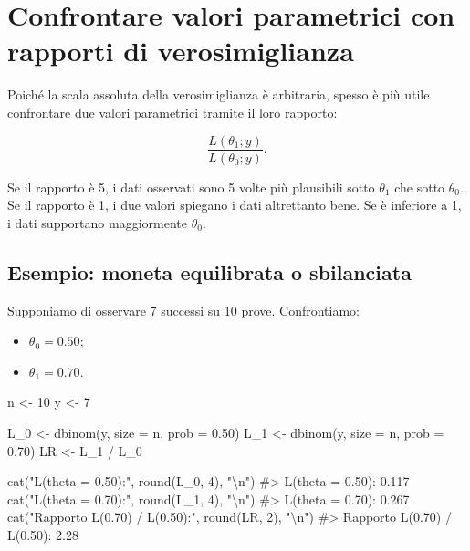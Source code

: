 \documentclass[
  italian,
  letterpaper,
  a4paper,
  11pt,
  open=any]{scrbook}
\newenvironment{Shaded}{\begin{snugshade}}{\end{snugshade}}
\newcommand{\AttributeTok}[1]{\textcolor[rgb]{0.40,0.45,0.13}{#1}}
\newcommand{\CommentTok}[1]{\textcolor[rgb]{0.37,0.37,0.37}{#1}}
\newcommand{\DecValTok}[1]{\textcolor[rgb]{0.68,0.00,0.00}{#1}}
\newcommand{\FloatTok}[1]{\textcolor[rgb]{0.68,0.00,0.00}{#1}}
\newcommand{\FunctionTok}[1]{\textcolor[rgb]{0.28,0.35,0.67}{#1}}
\newcommand{\NormalTok}[1]{\textcolor[rgb]{0.00,0.23,0.31}{#1}}
\newcommand{\OtherTok}[1]{\textcolor[rgb]{0.00,0.23,0.31}{#1}}
\newcommand{\SpecialCharTok}[1]{\textcolor[rgb]{0.37,0.37,0.37}{#1}}
\newcommand{\StringTok}[1]{\textcolor[rgb]{0.13,0.47,0.30}{#1}}
\providecommand{\tightlist}{%
  \setlength{\itemsep}{0pt}\setlength{\parskip}{0pt}}
\theoremstyle{plain}
\theoremstyle{definition}
\theoremstyle{definition}
\theoremstyle{remark}
\begin{document}
\section{Confrontare valori parametrici con rapporti di
verosimiglianza}\label{sec-likelihood-ratios}

Poiché la scala assoluta della verosimiglianza è arbitraria, spesso è
più utile confrontare due valori parametrici tramite il loro rapporto:

\[
\frac{L(\theta_1; y)}{L(\theta_0; y)}.
\]

Se il rapporto è 5, i dati osservati sono 5 volte più plausibili sotto
\(\theta_1\) che sotto \(\theta_0\). Se il rapporto è 1, i due valori
spiegano i dati altrettanto bene. Se è inferiore a 1, i dati supportano
maggiormente \(\theta_0\).

\subsection{Esempio: moneta equilibrata o
sbilanciata}\label{esempio-moneta-equilibrata-o-sbilanciata}

Supponiamo di osservare 7 successi su 10 prove. Confrontiamo:

\begin{itemize}
\tightlist
\item
  \(\theta_0 = 0.50\);
\item
  \(\theta_1 = 0.70\).
\end{itemize}

\begin{Shaded}
\begin{Highlighting}[]
\NormalTok{n }\OtherTok{\textless{}{-}} \DecValTok{10}
\NormalTok{y }\OtherTok{\textless{}{-}} \DecValTok{7}

\NormalTok{L\_0 }\OtherTok{\textless{}{-}} \FunctionTok{dbinom}\NormalTok{(y, }\AttributeTok{size =}\NormalTok{ n, }\AttributeTok{prob =} \FloatTok{0.50}\NormalTok{)}
\NormalTok{L\_1 }\OtherTok{\textless{}{-}} \FunctionTok{dbinom}\NormalTok{(y, }\AttributeTok{size =}\NormalTok{ n, }\AttributeTok{prob =} \FloatTok{0.70}\NormalTok{)}
\NormalTok{LR }\OtherTok{\textless{}{-}}\NormalTok{ L\_1 }\SpecialCharTok{/}\NormalTok{ L\_0}

\FunctionTok{cat}\NormalTok{(}\StringTok{"L(theta = 0.50):"}\NormalTok{, }\FunctionTok{round}\NormalTok{(L\_0, }\DecValTok{4}\NormalTok{), }\StringTok{"}\SpecialCharTok{\textbackslash{}n}\StringTok{"}\NormalTok{)}
\CommentTok{\#\textgreater{} L(theta = 0.50): 0.117}
\FunctionTok{cat}\NormalTok{(}\StringTok{"L(theta = 0.70):"}\NormalTok{, }\FunctionTok{round}\NormalTok{(L\_1, }\DecValTok{4}\NormalTok{), }\StringTok{"}\SpecialCharTok{\textbackslash{}n}\StringTok{"}\NormalTok{)}
\CommentTok{\#\textgreater{} L(theta = 0.70): 0.267}
\FunctionTok{cat}\NormalTok{(}\StringTok{"Rapporto L(0.70) / L(0.50):"}\NormalTok{, }\FunctionTok{round}\NormalTok{(LR, }\DecValTok{2}\NormalTok{), }\StringTok{"}\SpecialCharTok{\textbackslash{}n}\StringTok{"}\NormalTok{)}
\CommentTok{\#\textgreater{} Rapporto L(0.70) / L(0.50): 2.28}
\end{Highlighting}
\end{Shaded}
\end{document}
